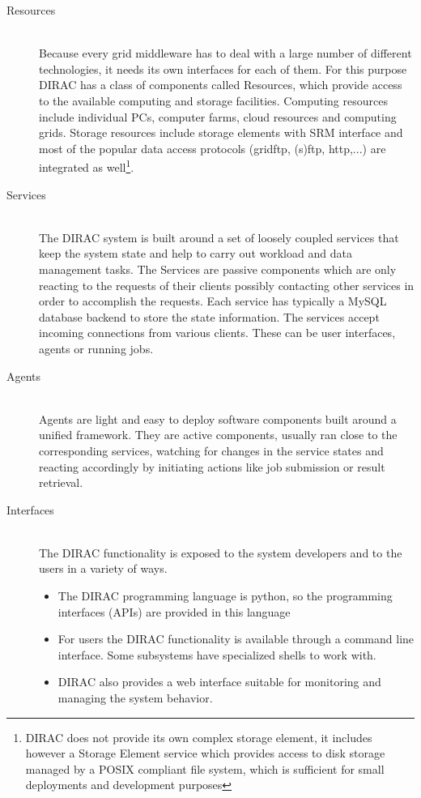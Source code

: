 \begin{description}

\item[Resources] \hfill \\
Because every grid middleware has to deal with a large number of different technologies, it needs its own 
interfaces for each of them. For this purpose DIRAC has a class of components called Resources,
which provide access to the available computing and storage facilities. 
Computing resources include individual PCs, computer farms, cloud resources and computing grids. Storage 
resources include storage elements with SRM interface \cite{SRM} and most of the popular data access 
protocols (gridftp, (s)ftp, http,...) are integrated as well\footnote{DIRAC does not provide its own complex 
storage element, it includes however a Storage Element service which provides access to disk 
storage managed by a POSIX compliant file system, which is sufficient for small deployments and development
purposes}.

\item[Services] \hfill \\


The DIRAC system is built around a set of loosely coupled services that keep the system state and
help to carry out workload and data management tasks. The Services are passive components which
are only reacting to the requests of their clients possibly contacting other services in order to
accomplish the requests. Each service has typically a MySQL database backend to store the state
information. The services accept incoming connections from various clients. These can be user interfaces,
agents or running jobs. 

\item[Agents] \hfill \\
Agents are light and easy to deploy software components built around a unified framework. They are active
components, usually ran close to the corresponding services, watching for changes in the service states and 
reacting accordingly by initiating actions like job submission or result retrieval. 

\item[Interfaces] \hfill \\
The DIRAC functionality is exposed to the system developers and to the users in a variety of ways. 
	\begin{itemize}
		\item The DIRAC programming language is python, so the programming interfaces (APIs) are provided in this 
			language
		\item For users the DIRAC functionality is available through a command line interface. Some subsystems 		
			have specialized shells to work with.
		\item DIRAC also provides a web interface suitable for monitoring and managing the system behavior.
	\end{itemize}

\end{description}

